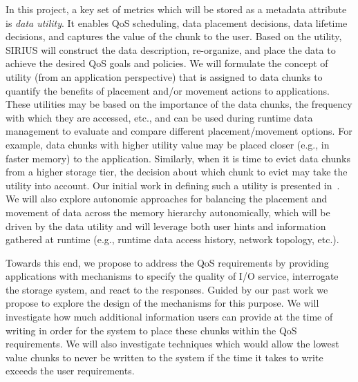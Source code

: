In this project, a key set of metrics which will be stored as a metadata
attribute is \textit{data utility}.  It enables QoS scheduling, data placement
decisions, data lifetime decisions, and captures the value of the chunk to
the user. 
Based on the utility, SIRIUS will construct the data description,
re-organize, and place the data to
achieve the desired QoS goals and policies.
 We will formulate the concept of utility (from an
application perspective) that is assigned to data chunks to quantify the
benefits of placement and/or movement actions to applications. These
utilities may be based on the importance of the data chunks, the frequency
with which they are accessed, etc., and can be used during runtime data
management to evaluate and compare different placement/movement options. 
For example, data chunks with higher utility value may be
placed closer (e.g., in faster memory) to the application.
Similarly, when it is time to evict data chunks from a higher storage
tier, the decision about which chunk to evict may take the utility into
account. Our initial work in defining such a utility is presented in~\cite{tongipdps15}.
 We will also explore autonomic approaches for balancing the placement and 
 movement of data across the memory hierarchy autonomically, which will be driven 
 by the data utility and will leverage both user hints and information gathered at runtime (e.g., runtime data access
history, network topology, etc.).

%

Towards this end, we propose to
address the QoS requirements by providing applications with mechanisms to
specify the quality of I/O service, interrogate the storage system, and react
to the responses. Guided by our past work we propose to explore the design of
the mechanisms for this purpose.  %
We will investigate how much additional information users
can provide at the time of writing in order for the system to place these chunks within
the QoS requirements. We will also investigate techniques which would allow the lowest
value chunks to never be written to the system if the time it takes to write exceeds the user
requirements.

